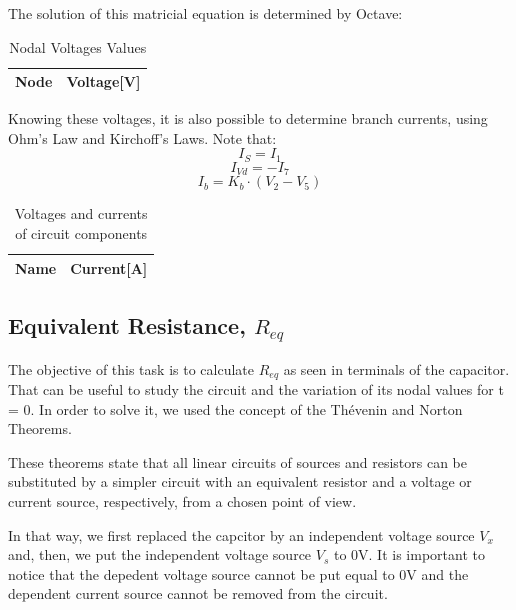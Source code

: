 The solution of this matricial equation is determined by Octave:
\begin{table}[H]
  \centering
  \begin{tabular}{|l|r|}
    \hline    
    {\bf Node} & {\bf Voltage[V]} \\ \hline
    
  \end{tabular}
  \caption{Nodal Voltages Values}
  \label{tab:nodal}
\end{table}

Knowing these voltages, it is also possible to determine branch currents, using Ohm’s Law and Kirchoff's Laws.
Note that:
\begin{equation}
  I_S=I_1
\end{equation}
\begin{equation}
  I_{Vd}=-I_7
 \end{equation}
 \begin{equation}
  I_b=K_b\cdot(V_2-V_5)
\end{equation}
 
 \begin{table}[H]
  \centering
  \begin{tabular}{|l|r|}
    \hline    
    {\bf Name} & {\bf Current[A]} \\ \hline
    
  \end{tabular}
  \caption{Voltages and currents of circuit components}
  \label{tab:valn}
\end{table}

\subsection{Equivalent Resistance, $R_{eq}$}
The objective of this task is to calculate $R_{eq}$ as seen in terminals of the capacitor. That can be useful to study the circuit and the variation of its nodal values for t = 0.
In order to solve it, we used the concept of the Thévenin and Norton Theorems.\par
These theorems state that all linear circuits of sources and resistors can be substituted by a simpler circuit with an equivalent resistor and a voltage or current source, respectively, from a chosen point of view.

In that way, we first replaced the capcitor by an independent voltage source $V_x$ and, then, we put the independent voltage source $V_s$ to 0V. It is important to notice that the depedent voltage source cannot be put equal to 0V and the dependent current source cannot be removed from the circuit.

